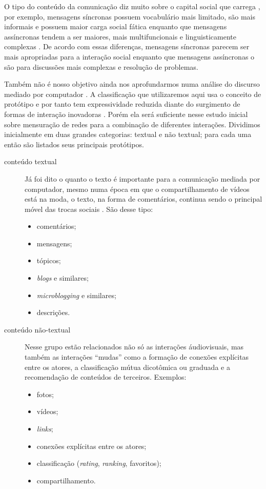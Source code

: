 O tipo do conteúdo da comunicação diz muito sobre o capital social que carrega
\citep{Kim2007}, por exemplo, mensagens síncronas possuem vocabulário mais
limitado, são mais informais e possuem maior carga social fática
\citep{Danet1998, Ko1996, WERRY1996} enquanto que mensagens assíncronas tendem a
ser maiores, mais multifuncionais e linguisticamente complexas
\citep{Herring1999}. De acordo com essas diferenças, mensagens síncronas parecem
ser mais apropriadas para a interação social enquanto que mensagens assíncronas o
são para discussões mais complexas e resolução de problemas.

Também não é nosso objetivo ainda nos aprofundarmos numa análise do discurso
mediado por computador \citep{Herring2001}. A classificação que utilizaremos aqui
usa o conceito de protótipo e por tanto tem expressividade reduzida diante do
surgimento de formas de interação inovadoras \citep{Herring2007}. Porém ela será
suficiente nesse estudo inicial sobre mensuração de redes para a combinação de
diferentes interações. Dividimos inicialmente em duas grandes categorias: textual
e não textual; para cada uma então são listados seus principais protótipos.

\begin{description}
\item[conteúdo textual] Já foi dito o quanto o texto é importante para a
comunicação mediada por computador, mesmo numa época em que o compartilhamento
de vídeos está na moda, o texto, na forma de comentários, continua sendo o
principal móvel das trocas sociais \citep{Herring2002}. São desse tipo:
\begin{itemize}
  \item comentários;
  \item mensagens;
  \item tópicos;
  \item \emph{blogs} e similares;
  \item \emph{microblogging} e similares;
  \item descrições.
\end{itemize}
\item[conteúdo não-textual] Nesse grupo estão relacionados não só as interações
áudiovisuais, mas também as interações ``mudas'' como a formação de conexões
explícitas entre os atores, a classificação mútua dicotômica ou graduada e a
recomendação de conteúdos de terceiros. Exemplos:
\begin{itemize}
  \item fotos;
  \item vídeos;
  \item \emph{links};
  \item conexões explícitas entre os atores;
  \item classificação (\emph{rating}, \emph{ranking}, favoritos);
  \item compartilhamento.
\end{itemize}
\end{description}

